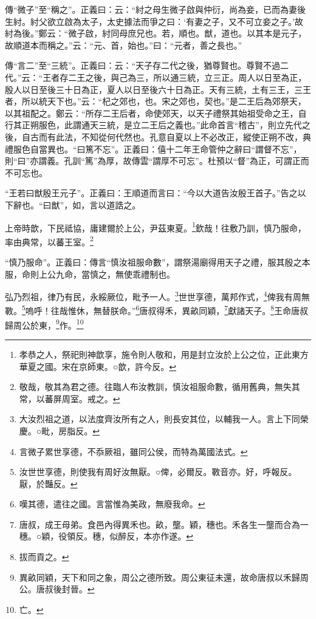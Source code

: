 {\noindent\zhuan{}\fzbyks 傳“微子”至“稱之”。正義曰：云：“紂之母生微子啟與仲衍，尚為妾，已而為妻後生紂。紂父欲立啟為太子，太史據法而爭之曰：‘有妻之子，又不可立妾之子。’故紂為後。”鄭云：“微子啟，紂同母庶兄也。若，順也。猷，道也。以其本是元子，故順道本而稱之。”云：“元、首，始也。”曰：“元者，善之長也。” \par}

{\noindent\zhuan{}\fzbyks 傳“言二”至“三統”。正義曰：云：“天子存二代之後，猶尊賢也。尊賢不過二代。”云：“王者存二王之後，與己為三，所以通三統，立三正。周人以日至為正，殷人以日至後三十日為正，夏人以日至後六十日為正。天有三統，土有三王，三王者，所以統天下也。”云：“杞之郊也，也。宋之郊也，契也。”是二王后為郊祭天，以其祖配之。鄭云：“所存二王后者，命使郊天，以天子禮祭其始祖受命之王，自行其正朔服色，此謂通天三統，是立二王后之義也。”此命首言“稽古”，則立先代之後，自古而有此法，不知從何代然也。孔意自夏以上不必改正，縱使正朔不改，典禮服色自當異也。“曰篤不忘”。正義曰：僖十二年王命管仲之辭曰“謂督不忘”，則“曰”亦謂義。孔訓“篤”為厚，故傳雲“謂厚不可忘”。杜預以“督”為正，可謂正而不可忘也。 \par}

{\noindent\shu{}\fzkt “王若曰猷殷王元子”。正義曰：王順道而言曰：“今以大道告汝殷王首子。”告之以下辭也。“曰猷”，如，言以道誥之。 \par}

上帝時歆，下民祗協，庸建爾於上公，尹茲東夏。\footnote{孝恭之人，祭祀則神歆享，施令則人敬和，用是封立汝於上公之位，正此東方華夏之國。宋在京師東。○歆，許今反。}欽哉！往敷乃訓，慎乃服命，率由典常，以蕃王室。\footnote{敬哉，敬其為君之德。往臨人布汝教訓，慎汝祖服命數，循用舊典，無失其常，以蕃屏周室。戒之。}

{\noindent\shu{}\fzkt “慎乃服命”。正義曰：傳言“慎汝祖服命數”，謂祭湯廟得用天子之禮，服其殷之本服，命則上公九命，當慎之，無使乖禮制也。 \par}

弘乃烈祖，律乃有民，永綏厥位，毗予一人。\footnote{大汝烈祖之道，以法度齊汝所有之人，則長安其位，以輔我一人。言上下同榮慶。○毗，房脂反。}世世享德，萬邦作式，\footnote{言微子累世享德，不忝厥祖，雖同公侯，而特為萬國法式。}俾我有周無斁。\footnote{汝世世享德，則使我有周好汝無厭。○俾，必爾反。斁音亦。好，呼報反。厭，於豔反。}嗚呼！往哉惟休，無替朕命。”\footnote{嘆其德，遣往之國。言當惟為美政，無廢我命。}唐叔得禾，異畝同穎，\footnote{唐叔，成王母弟。食邑內得異禾也。畝，壟。穎，穗也。禾各生一壟而合為一穗。○穎，役領反。穗，似醉反，本亦作遂。}獻諸天子。\footnote{拔而貢之。}王命唐叔歸周公於東，\footnote{異畝同穎，天下和同之象，周公之德所致。周公東征未還，故命唐叔以禾歸周公。唐叔後封晉。}作。\footnote{亡。}


